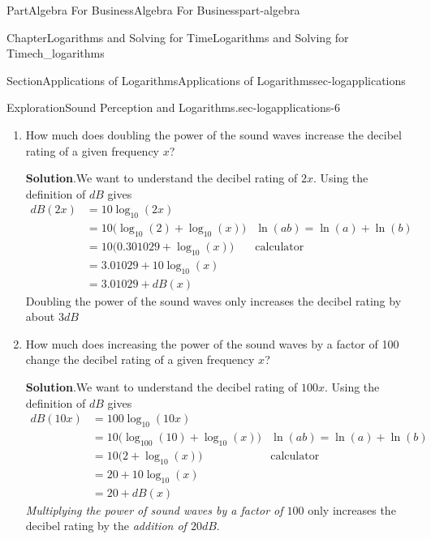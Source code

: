 \documentclass{tufte-book}
\newcommand{\blocktitlefont}{\relax}
\numberwithin{equation}{chapter}
\newcommand{\amp}{&}
\begin{document}
\begin{partptx}{Part}{Algebra For Business}{}{Algebra For Business}{}{}{part-algebra}
\begin{chapterptx}{Chapter}{Logarithms and Solving for Time}{}{Logarithms and Solving for Time}{}{}{ch_logarithms}
\begin{sectionptx}{Section}{Applications of Logarithms}{}{Applications of Logarithms}{}{}{sec-logapplications}
\begin{exploration}{Exploration}{Sound Perception and Logarithms.}{sec-logapplications-6}
\begin{enumerate}[font=\bfseries,label=(\alph*),ref=\alph*]
\par\smallskip%
\noindent\textbf{\blocktitlefont Solution}.\hypertarget{sec-logapplications-6-5-2}{}\quad{}\(dB(100,000,000)=10\cdot\log_{10}(100,000,000) = 10\cdot\log_{10}(10^8) = 80\) decibels.%
\par
The decibel rating of an alarm clock (80 dB) is twice the decibel rating of a quiet library (40 dB), so the library sounds twice as loud.%
\par
But surprisingly, this apparent doubling is actually the result of a \(\frac{100,000,000}{10,000}=10,000\)-fold increase in the power of the waves.%
\item{}How much does doubling the power of the sound waves increase the decibel rating of a given frequency \(x\)?%
\par\smallskip%
\noindent\textbf{\blocktitlefont Solution}.\hypertarget{sec-logapplications-6-6-2}{}\quad{}We want to understand the decibel rating of \(2x\). Using the definition of \(dB\) gives%
\begin{align*}
dB(2x) \amp = 10 \log_{10}(2x) \amp \\
\amp = 10\Big(\log_{10}(2) + \log_{10}(x)\Big) \amp \ln(ab)=\ln(a)+\ln(b)\\
\amp = 10\Big(0.301029 + \log_{10}(x)\Big) \amp \text{calculator}\\
\amp = 3.01029 + 10\log_{10}(x)  \amp \\
\amp = 3.01029 + dB(x)  \amp 
\end{align*}
Doubling the power of the sound waves only increases the decibel rating by about \(3dB\)%
\item{}How much does increasing the power of the sound waves by a factor of 100 change the decibel rating of a given frequency \(x\)?%
\par\smallskip%
\noindent\textbf{\blocktitlefont Solution}.\hypertarget{sec-logapplications-6-7-2}{}\quad{}We want to understand the decibel rating of \(100x\). Using the definition of \(dB\) gives%
\begin{align*}
dB(10x) \amp = 100 \log_{10}(10x) \amp \\
\amp = 10\Big(\log_{100}(10) + \log_{10}(x)\Big) \amp \ln(ab)=\ln(a)+\ln(b)\\
\amp = 10\Big(2 + \log_{10}(x)\Big) \amp \text{calculator}\\
\amp = 20 + 10\log_{10}(x)  \amp \\
\amp = 20 + dB(x)  \amp 
\end{align*}
\emph{Multiplying the power of sound waves by a factor of \(100\)} only increases the decibel rating by the \emph{addition of \(20dB\)}.%

\end{enumerate}
\end{exploration}
\end{sectionptx}
\end{chapterptx}
\end{partptx}
\end{document}
